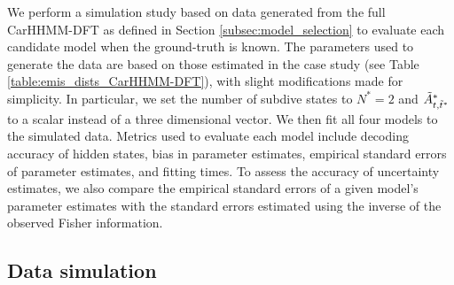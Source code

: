 
We perform a simulation study based on data generated from the full CarHHMM-DFT as defined in Section \ref{subsec:model_selection} to evaluate each candidate model when the ground-truth is known. The parameters used to generate the data are based on those estimated in the case study (see Table \ref{table:emis_dists_CarHHMM-DFT}), with slight modifications made for simplicity. In particular, we set the number of subdive states to $N^*=2$ and $\tilde{A}^*_{t,\tilde t^*}$ to a scalar instead of a three dimensional vector. We then fit all four models to the simulated data. Metrics used to evaluate each model include decoding accuracy of hidden states, bias in parameter estimates, empirical standard errors of parameter estimates, and fitting times. To assess the accuracy of uncertainty estimates, we also compare the empirical standard errors of a given model's parameter estimates with the standard errors estimated using the inverse of the observed Fisher information.

\subsection{Data simulation}
\label{subsec:data_simulation}

